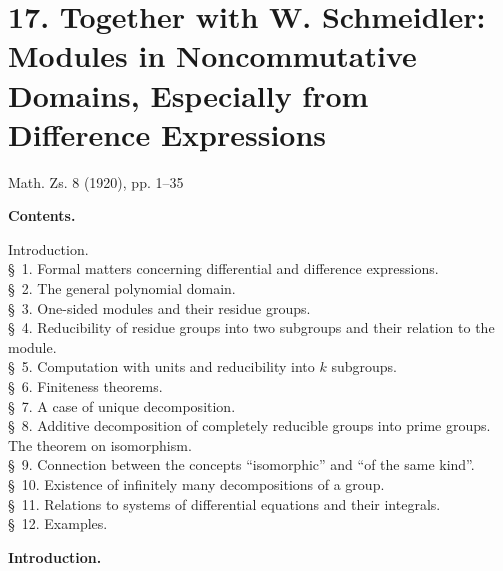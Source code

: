 \documentclass[11pt]{article}
\begin{document}
\clearpage
\setcounter{footnote}{0}
\section*{17. Together with W. Schmeidler: Modules in Noncommutative Domains, Especially from Difference Expressions}
\begin{center}
Math. Zs. 8 (1920), pp. 1--35
\end{center}

\begin{center}
\textbf{Contents.}
\end{center}
\begin{center}
\begin{minipage}{0.82\linewidth}
Introduction.\\
\S~1. Formal matters concerning differential and difference expressions.\\
\S~2. The general polynomial domain.\\
\S~3. One-sided modules and their residue groups.\\
\S~4. Reducibility of residue groups into two subgroups and their relation to the module.\\
\S~5. Computation with units and reducibility into $k$ subgroups.\\
\S~6. Finiteness theorems.\\
\S~7. A case of unique decomposition.\\
\S~8. Additive decomposition of completely reducible groups into prime groups. The theorem on isomorphism.\\
\S~9. Connection between the concepts ``isomorphic'' and ``of the same kind''.\\
\S~10. Existence of infinitely many decompositions of a group.\\
\S~11. Relations to systems of differential equations and their integrals.\\
\S~12. Examples.
\end{minipage}
\end{center}

\begin{center}\textbf{Introduction.}\end{center}
\end{document}
